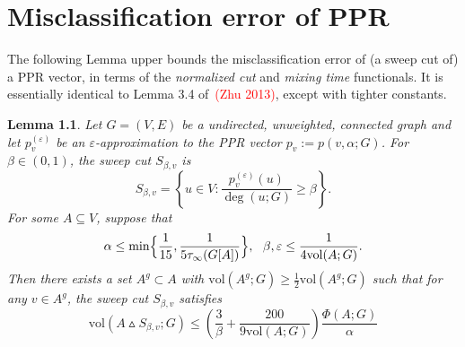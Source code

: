\documentclass{report}
\newcommand{\set}[1]{\left\{#1\right\}}
\newcommand{\vol}{\mathrm{vol}}
\newcommand{\1}{\mathbf{1}}
\theoremstyle{alden}
\theoremstyle{aldenthm}
\newtheorem{lemma}{Lemma}
\theoremstyle{definition}
\theoremstyle{remark}
\begin{document}
\chapter{Misclassification error of PPR}
The following Lemma upper bounds the misclassification error of (a sweep cut of) a PPR vector, in terms of the \emph{normalized cut} and \emph{mixing time} functionals. It is essentially identical to Lemma 3.4 of~\textcolor{red}{(Zhu 2013)}, except with tighter constants.
\begin{lemma}
	Let $G = (V,E)$ be a undirected, unweighted, connected graph and let $p_v^{(\varepsilon)}$ be an $\varepsilon$-approximation to the PPR vector $p_v := p(v,\alpha;G)$. For $\beta \in (0,1)$,  the sweep cut $S_{\beta,v}$ is
	\begin{equation*}
	S_{\beta,v} = \set{u \in V: \frac{p_v^{(\varepsilon)}(u)}{\deg(u;G)} \geq \beta}.
	\end{equation*} 
	For some $A \subseteq V$, suppose that 
	\begin{equation*}
	\alpha \leq \min\Bigl\{\frac{1}{15}, \frac{1}{5\tau_{\infty}(G[A])}\Bigr\},~~ \beta, \varepsilon \leq \frac{1}{4\vol(A;G)}.
	\end{equation*}
	Then there exists a set $A^g \subset A$ with $\vol(A^g;G) \geq \frac{1}{2}\vol(A^g;G)$ such that for any $v \in A^g$, the sweep cut $S_{\beta,v}$ satisfies
	\begin{equation*}
	\vol(A \vartriangle S_{\beta,v};G) \leq \left(\frac{3}{\beta} + \frac{200}{9\vol(A;G)}\right) \frac{\Phi(A;G)}{\alpha}
	\end{equation*}
\end{lemma}
\end{document}
